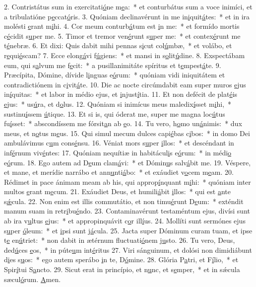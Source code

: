 2. Contristátus sum in exercitati\uline{ó}ne m\uline{e}a:~* et conturbátus sum a voce inimíci, et a tribulatióne p\uline{e}ccat\uline{ó}ris.
3. Quóniam declinavérunt in me in\uline{i}quit\uline{á}tes:~* et in ira molésti \uline{e}rant m\uline{i}hi.
4. Cor meum conturb\uline{á}tum est \uline{i}n me:~* et formído mortis c\uline{é}cidit s\uline{u}per me.
5. Timor et tremor ven\uline{é}runt s\uline{u}per me:~* et contex\uline{é}runt me t\uline{é}nebræ.
6. Et dixi: Quis dabit mihi pennas s\uline{i}cut col\uline{ú}mbæ,~* et volábo, et r\uline{e}qui\uline{é}scam?
7. Ecce elong\uline{á}vi f\uline{ú}giens:~* et mansi in s\uline{o}lit\uline{ú}dine.
8. Exspectábam eum, qui s\uline{a}lvum me f\uline{e}cit:~* a pusillanimitáte spíritus et t\uline{e}mpest\uline{á}te.
9. Præcípita, Dómine, dívide l\uline{i}nguas e\uline{ó}rum:~* quóniam vidi iniquitátem et contradictiónem in c\uline{i}vit\uline{á}te.
10. Die ac nocte circúmdabit eam super muros \uline{e}jus in\uline{í}quitas:~* et labor in médio ejus, et \uline{i}njust\uline{í}tia.
11. Et non defécit de plat\uline{é}is \uline{e}jus:~* us\uline{ú}ra, et d\uline{o}lus.
12. Quóniam si inimícus meus maledix\uline{í}sset m\uline{i}hi,~* sustinu\uline{í}ssem \uline{ú}tique.
13. Et si is, qui óderat me, super me magna loc\uline{ú}tus fu\uline{í}sset:~* abscondíssem me fórsit\uline{a}n ab \uline{e}o.
14. Tu vero, h\uline{o}mo un\uline{á}nimis:~* dux meus, et n\uline{o}tus m\uline{e}us.
15. Qui simul mecum dulces capi\uline{é}bas c\uline{i}bos:~* in domo Dei ambulávimus c\uline{u}m cons\uline{é}nsu.
16. Véniat mors s\uline{u}per \uline{i}llos:~* et descéndant in inf\uline{é}rnum viv\uline{é}ntes:
17. Quóniam nequítiæ in habitácul\uline{i}s e\uline{ó}rum:~* in médi\uline{o} e\uline{ó}rum.
18. Ego autem ad D\uline{e}um clam\uline{á}vi:~* et Dómin\uline{u}s salv\uline{á}bit me.
19. Véspere, et mane, et merídie narrábo et ann\uline{u}nti\uline{á}bo:~* et exáudiet v\uline{o}cem m\uline{e}am.
20. Rédimet in pace ánimam meam ab his, qui approp\uline{í}nquant m\uline{i}hi:~* quóniam inter multos \uline{e}rant m\uline{e}cum.
21. Exáudiet Deus, et humili\uline{á}bit \uline{i}llos:~* qui est \uline{a}nte s\uline{ǽ}cula.
22. Non enim est illis commutátio, et non timu\uline{é}runt D\uline{e}um:~* exténdit manum suam in retr\uline{i}bu\uline{é}ndo.
23. Contaminavérunt testaméntum ejus, divísi sunt ab ira v\uline{u}ltus \uline{e}jus:~* et appropinquávit c\uline{o}r ill\uline{í}us.
24. Mollíti sunt sermónes ejus s\uline{u}per \uline{ó}leum:~* et \uline{i}psi sunt j\uline{á}cula.
25. Jacta super Dóminum curam tuam, et ipse t\uline{e} en\uline{ú}triet:~* non dabit in ætérnum fluctuati\uline{ó}nem j\uline{u}sto.
26. Tu vero, Deus, ded\uline{ú}ces \uline{e}os,~* in púte\uline{u}m int\uline{é}ritus
27. Viri sánguinum, et dolósi non dimidiábunt d\uline{i}es s\uline{u}os:~* ego autem sperábo \uline{i}n te, D\uline{ó}mine.
28. Glória P\uline{a}tri, et F\uline{í}lio,~* et Spir\uline{í}tui S\uline{a}ncto.
29. Sicut erat in princípio, et n\uline{u}nc, et s\uline{e}mper,~* et in sǽcula sæcul\uline{ó}rum. \uline{A}men.
